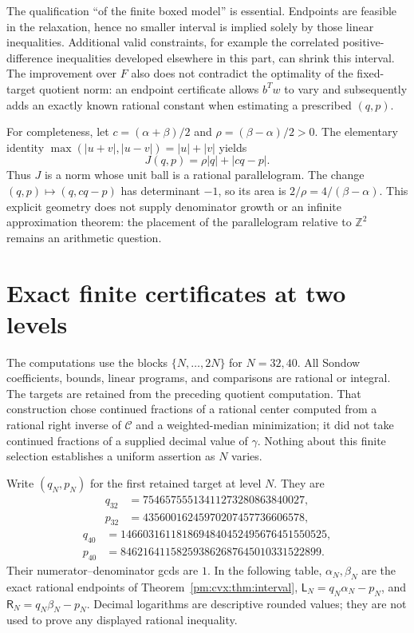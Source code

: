 \documentclass[11pt,a4paper]{article}
\newcommand{\Z}{\mathbb Z}
\theoremstyle{definition}
\theoremstyle{remark}
\numberwithin{equation}{section}
\begin{document}
The qualification ``of the finite boxed model'' is essential.
Endpoints are feasible in the relaxation, hence no smaller interval
is implied solely by those linear inequalities.  Additional valid
constraints, for example the correlated positive-difference
inequalities developed elsewhere in this part, can shrink this
interval.  The improvement over $F$ also does not contradict the
optimality of the fixed-target quotient norm: an endpoint certificate
allows $b^Tw$ to vary and subsequently adds an exactly known rational
constant when estimating a prescribed $(q,p)$.

For completeness, let $c=(\alpha+\beta)/2$ and
$\rho=(\beta-\alpha)/2>0$.  The elementary identity
$\max(|u+v|,|u-v|)=|u|+|v|$ yields
\begin{equation}\label{pm:cvx:eq:parallelogram}
 J(q,p)=\rho|q|+|cq-p|.
\end{equation}
Thus $J$ is a norm whose unit ball is a rational parallelogram.
The change $(q,p)\mapsto(q,cq-p)$ has determinant $-1$, so its
area is $2/\rho=4/(\beta-\alpha)$.  This explicit geometry does
not supply denominator growth or an infinite approximation theorem:
the placement of the parallelogram relative to $\Z^2$ remains an
arithmetic question.

\section{Exact finite certificates at two levels}
\label{pm:cvx:sec:finite}

The computations use the blocks $\{N,\ldots,2N\}$ for $N=32,40$.
All Sondow coefficients, bounds, linear programs, and comparisons
are rational or integral.  The targets are retained from the
preceding quotient computation.  That construction chose continued
fractions of a rational center computed from a rational right inverse
of $\mathcal C$ and a weighted-median minimization; it did not take
continued fractions of a supplied decimal value of $\gamma$.
Nothing about this finite selection establishes a uniform assertion
as $N$ varies.

Write $(q_N,p_N)$ for the first retained target at level $N$.  They are
\begin{equation}\label{pm:cvx:eq:target32}
 \begin{aligned}
 q_{32}&=75465755513411273280863840027,\\
 p_{32}&=43560016245970207457736606578,
 \end{aligned}
\end{equation}
\begin{equation}\label{pm:cvx:eq:target40}
 \begin{aligned}
 q_{40}&=1466031611818694840452495676451550525,\\
 p_{40}&=846216411582593862687645010331522899.
 \end{aligned}
\end{equation}
Their numerator--denominator gcds are $1$.  In the following table,
$\alpha_N,\beta_N$ are the exact rational endpoints of
Theorem~\ref{pm:cvx:thm:interval}, $\mathsf L_N=q_N\alpha_N-p_N$, and
$\mathsf R_N=q_N\beta_N-p_N$.  Decimal logarithms are descriptive rounded
values; they are not used to prove any displayed rational inequality.
\end{document}
